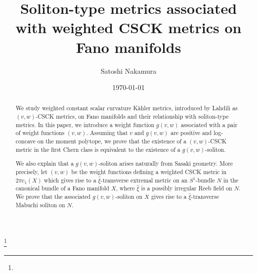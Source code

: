 \documentclass[12pt]{amsart}
\numberwithin{equation}{section}%
\theoremstyle{plain}
\theoremstyle{definition}
\newcommand{\1}{\mathbf{1}}
\begin{document}
\title[Soliton-type metrics associated with weighted CSCK metrics]
{Soliton-type metrics associated with weighted CSCK metrics
on Fano manifolds}
\author[S. Nakamura]
{Satoshi Nakamura} 

\thanks{ %
}
\address{
}
\email{}

\address{
S. Nakamura:
Department of Mathematics, Institute of Science Tokyo,
2-12-1, Ookayama, Meguro-ku, Tokyo, 152-8551, Japan
}

\date{\today}


\maketitle

\begin{abstract}
We study weighted constant scalar curvature K\"ahler metrics,
introduced by Lahdili as $(v,w)$-CSCK metrics,
on Fano manifolds and their relationship with soliton-type metrics.
In this paper, we introduce a weight function $g(v,w)$
associated with a pair of weight functions $(v,w)$.
Assuming that $v$ and $g(v,w)$ are positive and log-concave
on the moment polytope,
we prove that the existence of a $(v,w)$-CSCK
metric in the first Chern class is equivalent to the existence of a
$g(v,w)$-soliton.

We also explain that a $g(v,w)$-soliton arises naturally from
Sasaki geometry.
More precisely, let $(v,w)$ be the weight functions defining a weighted CSCK metric
in $2\pi c_1(X)$ which gives rise to a $\hat{\xi}$-transverse extremal
metric on an $S^1$-bundle $N$ in the canonical bundle of a Fano
manifold $X$, where $\hat{\xi}$ is a possibly irregular Reeb field on $N$.
We prove that the associated $g(v,w)$-soliton on $X$ gives rise to a
$\hat{\xi}$-transverse Mabuchi soliton on $N$.
\end{abstract}


\tableofcontents


\end{document}
